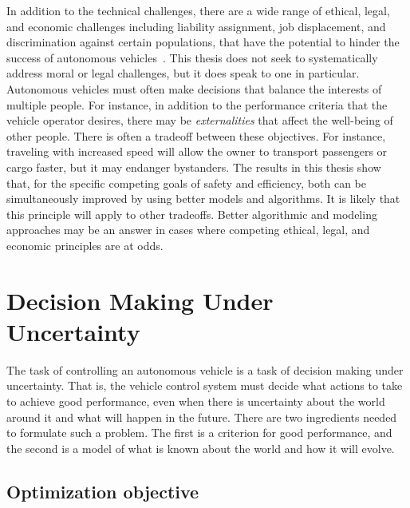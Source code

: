 In addition to the technical challenges, there are a wide range of ethical, legal, and economic challenges including liability assignment, job displacement, and discrimination against certain populations, that have the potential to hinder the success of autonomous vehicles~\cite{casey2016amoral}.
This thesis does not seek to systematically address moral or legal challenges, but it does speak to one in particular.
Autonomous vehicles must often make decisions that balance the interests of multiple people.
For instance, in addition to the performance criteria that the vehicle operator desires, there may be \emph{externalities} that affect the well-being of other people.
There is often a tradeoff between these objectives.
For instance, traveling with increased speed will allow the owner to transport passengers or cargo faster, but it may endanger bystanders.
The results in this thesis show that, for the specific competing goals of safety and efficiency, both can be simultaneously improved by using better models and algorithms.
It is likely that this principle will apply to other tradeoffs.
Better algorithmic and modeling approaches may be an answer in cases where competing ethical, legal, and economic principles are at odds.

% 

\section{Decision Making Under Uncertainty}

The task of controlling an autonomous vehicle is a task of decision making under uncertainty.
That is, the vehicle control system must decide what actions to take to achieve good performance, even when there is uncertainty about the world around it and what will happen in the future.
There are two ingredients needed to formulate such a problem.
The first is a criterion for good performance, and the second is a model of what is known about the world and how it will evolve.

\subsection{Optimization objective}

